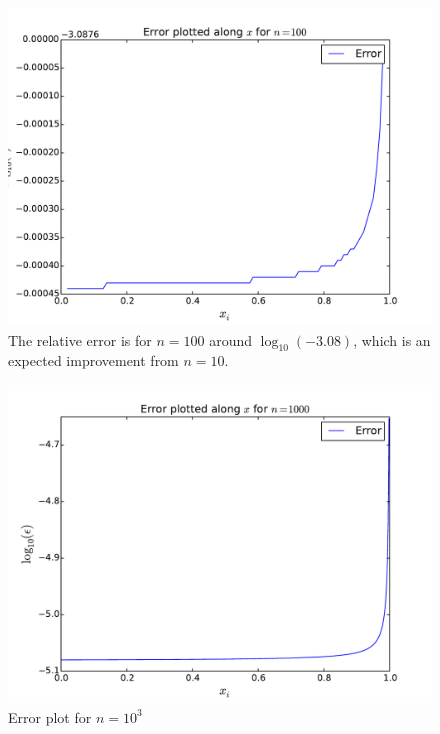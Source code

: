 \documentclass[english, 11pt]{article}
\begin{document}
\begin{figure}[H]
    \centering
    \includegraphics[width = .9\textwidth]{error_n_100.pdf}
    \caption{The relative error is for $n=100$ around $\log_{10}(-3.08)$, which is an expected improvement from $n=10$.}
    \label{fig:en102}
\end{figure}

\begin{figure}[H]
    \centering
    \includegraphics[width = .9\textwidth]{error_n_1000.pdf}
    \caption{Error plot for $n=10^3$}
    \label{fig:en103}
\end{figure}
\end{document}
